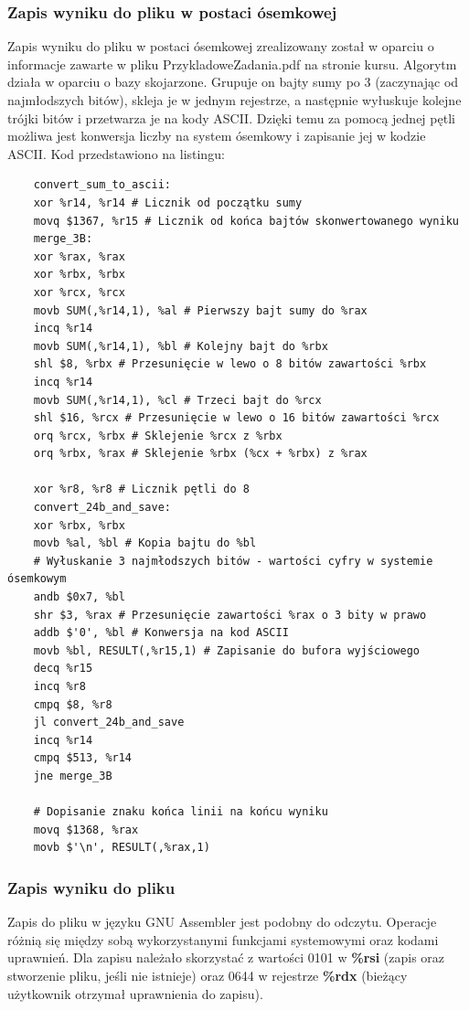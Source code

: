 \documentclass[a4paper,12pt]{article}
\begin{document}
\subsubsection{Zapis wyniku do pliku w postaci ósemkowej}
Zapis wyniku do pliku w postaci ósemkowej zrealizowany został w oparciu o informacje zawarte w pliku PrzykladoweZadania.pdf na stronie kursu. Algorytm działa w oparciu o bazy skojarzone. Grupuje on bajty sumy po 3 (zaczynając od najmłodszych bitów), skleja je w jednym rejestrze, a następnie wyłuskuje kolejne trójki bitów i przetwarza je na kody ASCII.  Dzięki temu za pomocą jednej pętli możliwa jest konwersja liczby na system ósemkowy i zapisanie jej w kodzie ASCII. Kod przedstawiono na listingu:
\begin{verbatim}
	convert_sum_to_ascii:
	xor %r14, %r14 # Licznik od początku sumy
	movq $1367, %r15 # Licznik od końca bajtów skonwertowanego wyniku
	merge_3B:
	xor %rax, %rax
	xor %rbx, %rbx
	xor %rcx, %rcx
	movb SUM(,%r14,1), %al # Pierwszy bajt sumy do %rax
	incq %r14 
	movb SUM(,%r14,1), %bl # Kolejny bajt do %rbx
	shl $8, %rbx # Przesunięcie w lewo o 8 bitów zawartości %rbx
	incq %r14
	movb SUM(,%r14,1), %cl # Trzeci bajt do %rcx
	shl $16, %rcx # Przesunięcie w lewo o 16 bitów zawartości %rcx
	orq %rcx, %rbx # Sklejenie %rcx z %rbx
	orq %rbx, %rax # Sklejenie %rbx (%cx + %rbx) z %rax
	
	xor %r8, %r8 # Licznik pętli do 8
	convert_24b_and_save:
	xor %rbx, %rbx
	movb %al, %bl # Kopia bajtu do %bl
	# Wyłuskanie 3 najmłodszych bitów - wartości cyfry w systemie ósemkowym
	andb $0x7, %bl
	shr $3, %rax # Przesunięcie zawartości %rax o 3 bity w prawo
	addb $'0', %bl # Konwersja na kod ASCII
	movb %bl, RESULT(,%r15,1) # Zapisanie do bufora wyjściowego
	decq %r15
	incq %r8
	cmpq $8, %r8
	jl convert_24b_and_save
	incq %r14
	cmpq $513, %r14
	jne merge_3B
	
	# Dopisanie znaku końca linii na końcu wyniku
	movq $1368, %rax
	movb $'\n', RESULT(,%rax,1)
\end{verbatim}
\subsubsection{Zapis wyniku do pliku}
Zapis do pliku w języku GNU Assembler jest podobny do odczytu. Operacje różnią się między sobą wykorzystanymi funkcjami systemowymi oraz kodami uprawnień. Dla zapisu należało skorzystać z wartości 0101 w \textbf{\%rsi} (zapis oraz stworzenie pliku, jeśli nie istnieje) oraz 0644 w rejestrze \textbf{\%rdx} (bieżący użytkownik otrzymał uprawnienia do zapisu).
\end{document}
